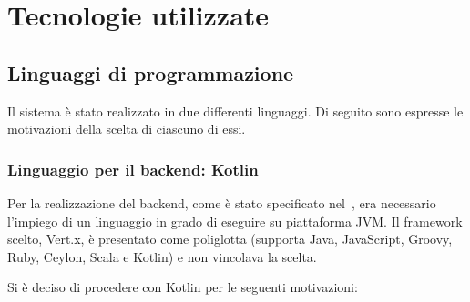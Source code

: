 \section{Tecnologie utilizzate}

  \subsection{Linguaggi di programmazione}
    Il sistema è stato realizzato in due differenti linguaggi. Di seguito sono espresse le motivazioni della scelta di ciascuno di essi.

    \subsubsection{Linguaggio per il backend: Kotlin}

      Per la realizzazione del backend, come è stato specificato nel~, era necessario l'impiego di un linguaggio in grado di eseguire su piattaforma JVM\@.
      Il framework scelto, Vert.x, è presentato come poliglotta (supporta Java, JavaScript, Groovy, Ruby, Ceylon, Scala e Kotlin) e non vincolava la scelta.

      Si è deciso di procedere con Kotlin per le seguenti motivazioni:

